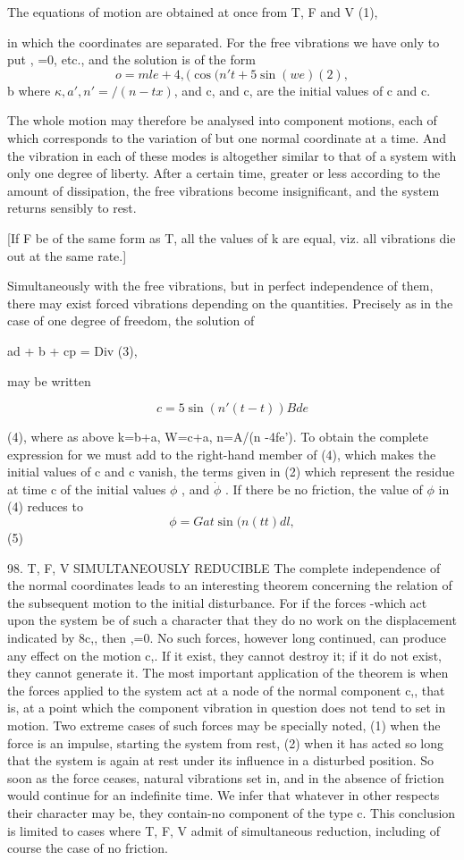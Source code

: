The equations of motion are obtained at once from T, F and V (1),

in which the coordinates are separated. For the free vibrations we have only to
put , =0, etc., and the solution is of the form
\[o= mle + 4, ( \cos(n't + 5 \sin(we) (2), \]
b where \( \kappa , a', n' =/(n -tx) \), and c, and c, are the
initial values of c and c.

The whole motion may therefore be analysed into component motions, each of
which corresponds to the variation of but one normal coordinate at a time. And
the vibration in each of these modes is altogether similar to that of a system
with only one degree of liberty. After a certain time, greater or less
according to the amount of dissipation, the free vibrations become
insignificant, and the system returns sensibly to rest.

[If F be of the same form as T, all the values of k are equal, viz. all
vibrations die out at the same rate.]

Simultaneously with the free vibrations, but in perfect independence of them,
there may exist forced vibrations depending on the quantities.  Precisely as in
the case of one degree of freedom, the solution of

ad + b + cp = Div (3),

may be written

\[c =5   \sin(n' (t- t) )B de\]

(4), where as above k=b+a, W=c+a, n=A/(n -4fe'). To obtain the complete
expression for we must add to the right-hand member of (4), which makes the
initial values of c and c vanish, the terms given in (2) which represent the
residue at time c of the initial values \(\phi\) , and \(\dot{\phi} \) . If there be no
friction, the value of \(\phi\) in (4) reduces to
\[ \phi = Gat \sin(n (tt)  dl,\]
(5)

98.  T, F, V SIMULTANEOUSLY REDUCIBLE
The complete independence of the normal coordinates leads to an interesting
theorem concerning the relation of the subsequent motion to the initial
disturbance. For if the forces -which act upon the system be of such a
character that they do no work on the displacement indicated by 8c,, then ,=0.
No such forces, however long continued, can produce any effect on the motion
c,. If it exist, they cannot destroy it; if it do not exist, they cannot
generate it. The most important application of the theorem is when the forces
applied to the system act at a node of the normal component c,, that is, at a
point which the component vibration in question does not tend to set in motion.
Two extreme cases of such forces may be specially noted, (1) when the force is
an impulse, starting the system from rest, (2) when it has acted so long that
the system is again at rest under its influence in a disturbed position. So
soon as the force ceases, natural vibrations set in, and in the absence of
friction would continue for an indefinite time. We infer that whatever in other
respects their character may be, they contain-no component of the type c. This
conclusion is limited to cases where T, F, V admit of simultaneous reduction,
including of course the case of no friction.

